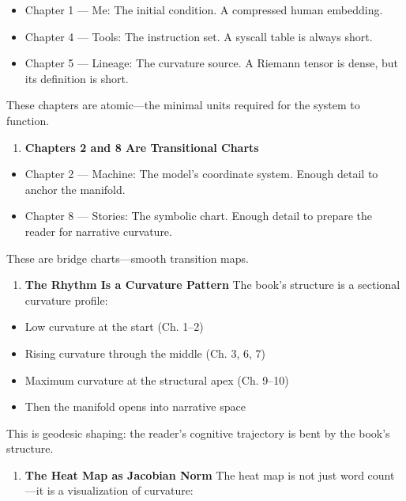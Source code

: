 \begin{itemize}
\tightlist
\item
  Chapter 1 --- Me: The initial condition. A compressed human embedding.
\item
  Chapter 4 --- Tools: The instruction set. A syscall table is always
  short.
\item
  Chapter 5 --- Lineage: The curvature source. A Riemann tensor is
  dense, but its definition is short.
\end{itemize}

These chapters are atomic---the minimal units required for the system to
function.

\begin{enumerate}
\def\labelenumi{\arabic{enumi}.}
\setcounter{enumi}{2}
\tightlist
\item
  \textbf{Chapters 2 and 8 Are Transitional Charts}
\end{enumerate}

\begin{itemize}
\tightlist
\item
  Chapter 2 --- Machine: The model's coordinate system. Enough detail to
  anchor the manifold.
\item
  Chapter 8 --- Stories: The symbolic chart. Enough detail to prepare
  the reader for narrative curvature.
\end{itemize}

These are bridge charts---smooth transition maps.

\begin{enumerate}
\def\labelenumi{\arabic{enumi}.}
\setcounter{enumi}{3}
\tightlist
\item
  \textbf{The Rhythm Is a Curvature Pattern} The book's structure is a
  sectional curvature profile:
\end{enumerate}

\begin{itemize}
\tightlist
\item
  Low curvature at the start (Ch. 1--2)
\item
  Rising curvature through the middle (Ch. 3, 6, 7)
\item
  Maximum curvature at the structural apex (Ch. 9--10)
\item
  Then the manifold opens into narrative space
\end{itemize}

This is geodesic shaping: the reader's cognitive trajectory is bent by
the book's structure.

\begin{enumerate}
\def\labelenumi{\arabic{enumi}.}
\setcounter{enumi}{4}
\tightlist
\item
  \textbf{The Heat Map as Jacobian Norm} The heat map is not just word
  count---it is a visualization of curvature:
\end{enumerate}

